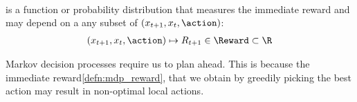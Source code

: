 \begin{defnbox}\nospacing
  \begin{defn}\label{defn:mdp_reward}\leavevmode\\
    is a function or probability distribution that measures the immediate reward and may depend on
    a any subset of $\left(x_{t+1},x_{t},\action\right)$:
    \begin{align}
      \left(x_{t+1},x_{t},\action\right)\mapsto R_{t+1}\in\Reward\subset\R
    \end{align}
  \end{defn}
\end{defnbox}
\begin{sectionbox}\nospacing
  Markov decision processes require us to plan ahead. This is because the immediate reward\cref{defn:mdp_reward},
  that we obtain by greedily picking the best action may result in non-optimal local actions.
\end{sectionbox}
